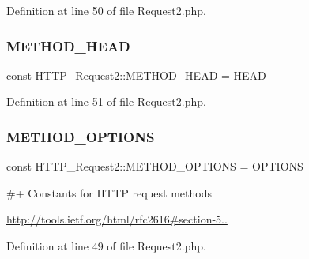 Definition at line 50 of file Request2.\+php.

\hypertarget{classHTTP__Request2_abb68a728946a9da5f19d5bb0cf676d58}{}\label{classHTTP__Request2_abb68a728946a9da5f19d5bb0cf676d58} 
\subsubsection{\texorpdfstring{M\+E\+T\+H\+O\+D\+\_\+\+H\+E\+AD}{METHOD\_HEAD}}
{\footnotesize\ttfamily const H\+T\+T\+P\+\_\+\+Request2\+::\+M\+E\+T\+H\+O\+D\+\_\+\+H\+E\+AD = \textquotesingle{}H\+E\+AD\textquotesingle{}}



Definition at line 51 of file Request2.\+php.

\hypertarget{classHTTP__Request2_a65c57cec36149d220f6cd30d43eb59b7}{}\label{classHTTP__Request2_a65c57cec36149d220f6cd30d43eb59b7} 
\subsubsection{\texorpdfstring{M\+E\+T\+H\+O\+D\+\_\+\+O\+P\+T\+I\+O\+NS}{METHOD\_OPTIONS}}
{\footnotesize\ttfamily const H\+T\+T\+P\+\_\+\+Request2\+::\+M\+E\+T\+H\+O\+D\+\_\+\+O\+P\+T\+I\+O\+NS = \textquotesingle{}O\+P\+T\+I\+O\+NS\textquotesingle{}}

\#+ Constants for H\+T\+TP request methods

\hyperlink{}{http\+://tools.\+ietf.\+org/html/rfc2616\#section-\/5..}

Definition at line 49 of file Request2.\+php.

\hypertarget{classHTTP__Request2_ae42a6ae396ef8abacf8e54a64a64df22}{}\label{classHTTP__Request2_ae42a6ae396ef8abacf8e54a64a64df22} 
